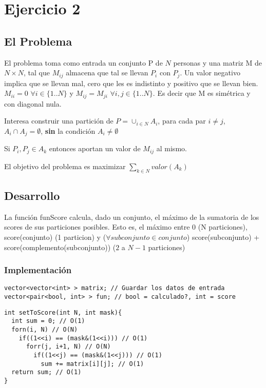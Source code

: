 \section{Ejercicio 2}

\subsection{El Problema}

El problema toma como entrada un conjunto P de $N$ personas y una matriz M de $N \times N$, tal que $M_{ij}$ almacena que tal se llevan $P_i$ con $P_j$. Un valor negativo implica que se llevan mal, cero que les es indistinto y positivo que se llevan bien. $M_{ii} = 0$ $\forall i \in \{1..N\}$ y $M_{ij} = M_{ji}$  $\forall i, j \in \{1..N\}$. Es decir que M es sim\'etrica y con diagonal nula. 

Interesa construir una partici\'on de $P = \cup_{i \in N} A_i$, para cada par $i \neq j$, $A_i \cap A_j = \emptyset$, \textbf{sin} la condici\'on $A_i \neq \emptyset$

Si $P_i, P_j \in A_k$ entonces aportan un valor de $M_{ij}$ al mismo.

El objetivo del problema es maximizar $\sum_{k \in N} valor(A_k)$

\subsection{Desarrollo}

La funci\'on funScore calcula, dado un conjunto, el m\'aximo de la sumatoria de los scores de sus particiones posibles. Esto es, el m\'aximo entre 0 (N particiones), score(conjunto) (1 particion) y ($\forall subconjunto \in conjunto$) score(subconjunto) + score(complemento(subconjunto)) ($2$ a $N-1$ particiones)

\subsubsection{Implementación}

\begin{verbatim}
vector<vector<int> > matrix; // Guardar los datos de entrada
vector<pair<bool, int> > fun; // bool = calculado?, int = score
\end{verbatim}

\begin{verbatim}
int setToScore(int N, int mask){
  int sum = 0; // O(1)
  forn(i, N) // O(N)
    if((1<<i) == (mask&(1<<i))) // O(1)
      forr(j, i+1, N) // O(N)
        if((1<<j) == (mask&(1<<j))) // O(1)
          sum += matrix[i][j]; // O(1)
  return sum; // O(1)
}
\end{verbatim}

